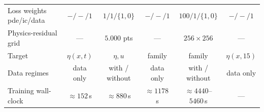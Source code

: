 \begin{table}[htbp]
\begin{tabular}{@{}lccccc@{}}
        Loss weights pde/ic/data  & $-/-/1$     & $1/1/\{1,0\}$ & $-/-/1$        & $100/1/\{1,0\}$  & $-/-/1$ \\
        Physics-residual grid     & ---         & $5.000$ pts & ---            & $256 \times 256$ & --- \\
        Target                    & $\eta(x,t)$ & $\eta, u$     & family         & family           & $\eta(x, 15)$ \\
        Data regimes              & data only   & with / without & data only    & with / without & data only \\
        Training wall-clock       & $\approx 152$\,s & $\approx 880$\,s & $\approx 1178$\,s & $\approx 4440$--$5460$\,s & --- \\
        \hline
    \end{tabular}
    \\[0.4em]
    \autoriapropria
\end{table}
